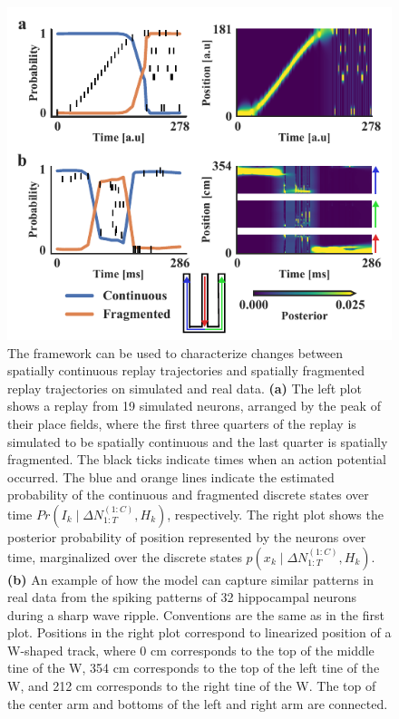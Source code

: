 \documentclass[conference]{IEEEtran}
\begin{document}
\begin{figure}[t]
\centerline{\includegraphics{fig1.pdf}}
\caption{The framework can be used to characterize changes between spatially continuous replay trajectories and spatially fragmented replay trajectories on simulated and real data. \textbf{(a)} The left plot shows a replay from 19 simulated neurons, arranged by the peak of their place fields, where the first three quarters of the replay is simulated to be spatially continuous and the last quarter is spatially fragmented. The black ticks indicate times when an action potential occurred. The blue and orange lines indicate the estimated probability of the continuous and fragmented discrete states over time $Pr(I_{k} \mid \Delta N_{1:T}^{(1:C)}, H_{k})$, respectively. The right plot shows the posterior probability of position represented by the neurons over time, marginalized over the discrete states $p(x_{k} \mid \Delta N_{1:T}^{(1:C)}, H_{k})$. \textbf{(b)} An example of how the model can capture similar patterns in real data from the spiking patterns of 32 hippocampal neurons during a sharp wave ripple. Conventions are the same as in the first plot. Positions in the right plot correspond to linearized position of a W-shaped track, where 0 cm corresponds to the top of the middle tine of the W, 354 cm corresponds to the top of the left tine of the W, and 212 cm corresponds to the right tine of the W. The top of the center arm and bottoms of the left and right arm are connected.}
\label{fig1}
\end{figure}
\end{document}
